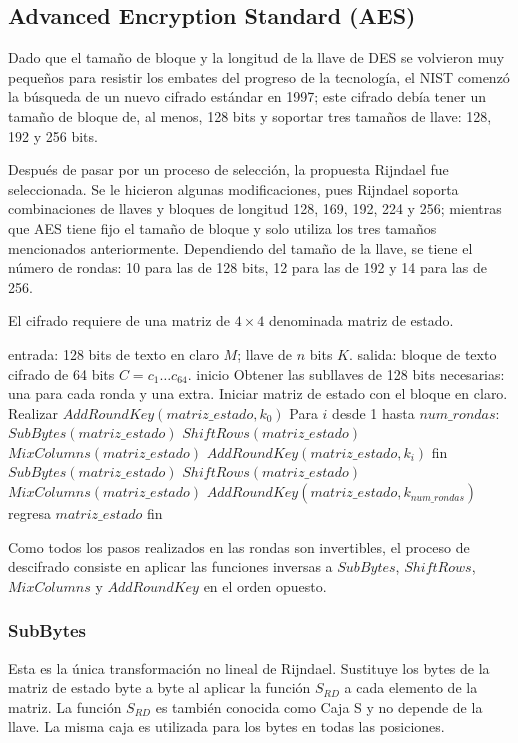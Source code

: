 \subsection{Advanced Encryption Standard (AES)}

Dado que el tamaño de bloque y la longitud de la llave de DES 
se volvieron muy pequeños para resistir los embates del progreso
de la tecnología, el NIST comenzó la búsqueda de un nuevo cifrado
estándar en 1997; este cifrado debía tener un tamaño de bloque de,
al menos, 128 bits y soportar tres tamaños de llave: 128, 192 y 256 bits.

Después de pasar por un proceso de selección, la propuesta Rijndael fue
seleccionada. Se le hicieron algunas modificaciones, pues Rijndael soporta
combinaciones de llaves y bloques de longitud 128, 169, 192, 224 y 256;
mientras que AES tiene fijo el tamaño de bloque y solo utiliza los tres
tamaños mencionados anteriormente. Dependiendo del tamaño de la llave, se
tiene el número de rondas: 10 para las de 128 bits, 12 para las de 192 y 14 para las de 256.

El cifrado requiere de una matriz de $4 \times 4$ denominada matriz de 
estado.

\begin{pseudocodigo}[caption={AES, cifrado.}, label={aes:1}]
  entrada:	128 bits de texto en claro $M$; llave de $n$ bits $K$.
  salida: 	bloque de texto cifrado de 64 bits $C = c_1 \dots c_{64}$.
  inicio
  Obtener las subllaves de 128 bits necesarias: una para cada ronda y una extra.
  Iniciar matriz de estado con el bloque en claro.
  Realizar $AddRoundKey(matriz\_estado, k_0)$
  Para $i$ desde 1 hasta $num\_rondas$:
  	$SubBytes(matriz\_estado)$
  	$ShiftRows(matriz\_estado)$
  	$MixColumns(matriz\_estado)$
  	$AddRoundKey(matriz\_estado, k_i)$
  fin
  $SubBytes(matriz\_estado)$
  $ShiftRows(matriz\_estado)$
  $MixColumns(matriz\_estado)$
  $AddRoundKey(matriz\_estado, k_{num\_rondas})$
  regresa $matriz\_estado$
  fin
\end{pseudocodigo}

Como todos los pasos realizados en las rondas son invertibles, el 
proceso de descifrado consiste en aplicar las funciones inversas a 
$SubBytes$, $ShiftRows$, $MixColumns$ y $AddRoundKey$ en el orden 
opuesto. 

\subsubsection{SubBytes}
Esta es la única transformación no lineal de Rijndael. Sustituye
los bytes de la matriz de estado byte a byte al aplicar la función
$S_{RD}$ a cada elemento de la matriz. La función $S_{RD}$ es también
conocida como Caja S y no depende de la llave. La misma caja es utilizada
para los bytes en todas las posiciones.

